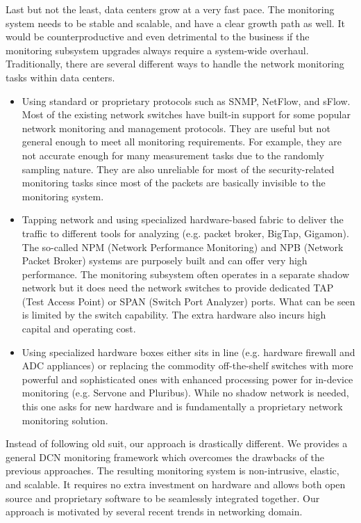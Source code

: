\documentclass{acm_proc_article-sp}
\begin{document}
Last but not the least, data centers grow at a very fast pace. The monitoring system needs to be stable and scalable, and have a clear growth path as well. It would be counterproductive and even detrimental to the business if the monitoring subsystem upgrades always require a system-wide overhaul.\\
Traditionally, there are several different ways to handle the network monitoring tasks within data centers.\\
\begin{itemize}
\item Using standard or proprietary protocols such as SNMP\cite{snmp}, NetFlow\cite{netflow}, and sFlow\cite{sflow}. Most of the existing network switches have built-in support for some popular network monitoring and management protocols. They are useful but not general enough to meet all monitoring requirements. For example, they are not accurate enough for many measurement tasks due to the randomly sampling nature. They are also unreliable for most of the security-related monitoring tasks since most of the packets are basically invisible to the monitoring system.
\item Tapping network and using specialized hardware-based fabric to deliver the traffic to different tools for analyzing (e.g. packet broker\cite{packetbroker}, BigTap\cite{bigtap}, Gigamon\cite{gigamon}). The so-called NPM (Network Performance Monitoring) and NPB (Network Packet Broker) systems are purposely built and can offer very high performance. The monitoring subsystem often operates in a separate shadow network but it does need the network switches to provide dedicated TAP (Test Access Point) or SPAN (Switch Port Analyzer) ports. What can be seen is limited by the switch capability. The extra hardware also incurs high capital and operating cost.
\item Using specialized hardware boxes either sits in line (e.g. hardware firewall\cite{hardware} and ADC appliances\cite{adc1,adc2}) or replacing the commodity off-the-shelf switches with more powerful and sophisticated ones with enhanced processing power for in-device monitoring (e.g. Servone\cite{servone} and Pluribus\cite{pluribus}). While no shadow network is needed, this one asks for new hardware and is fundamentally a proprietary network monitoring solution.
\end{itemize}
Instead of following old suit, our approach is drastically different. We provides a general DCN monitoring framework which overcomes the drawbacks of the previous approaches. The resulting monitoring system is non-intrusive, elastic, and scalable. It requires no extra investment on hardware and allows both open source and proprietary software to be seamlessly integrated together. Our approach is motivated by several recent trends in networking domain.\\
\end{document}

